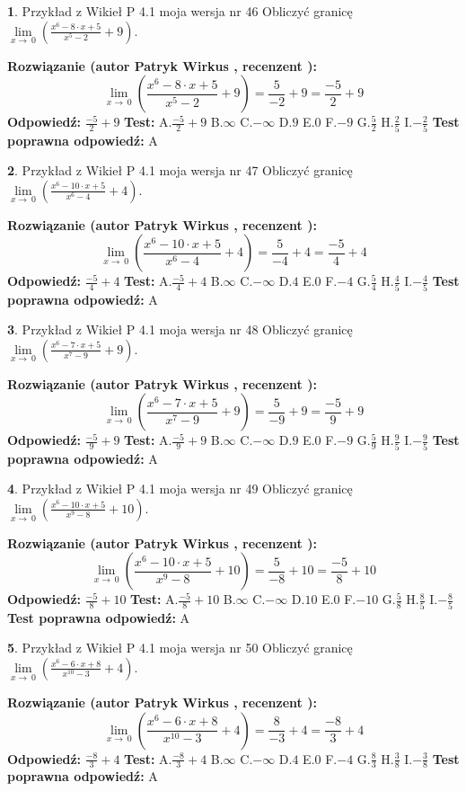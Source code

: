 \documentclass[12pt, a4paper]{article}
\theoremstyle{definition} %
\newtheorem{zad}{}
\newcommand{\zadStart}[1]{\begin{zad}#1\newline}
\newcommand{\zadStop}{\end{zad}}
\newcommand{\rozwStart}[2]{\noindent \textbf{Rozwiązanie (autor #1 , recenzent #2): }\newline}
\newcommand{\rozwStop}{\newline}
\newcommand{\odpStart}{\noindent \textbf{Odpowiedź:}\newline}
\newcommand{\odpStop}{\newline}
\newcommand{\testStart}{\noindent \textbf{Test:}\newline}
\newcommand{\testStop}{\newline}
\newcommand{\kluczStart}{\noindent \textbf{Test poprawna odpowiedź:}\newline}
\newcommand{\kluczStop}{\newline}
\begin{document}
\zadStart{Przykład z Wikieł P 4.1 moja wersja nr 46}
Obliczyć granicę $\lim\limits_{x\to\ 0}(\frac{x^{6}-8 \cdot x +5}{x^{5}-2}+9)$.
\zadStop
\rozwStart{Patryk Wirkus}{}
$$\lim\limits_{x\to\ 0}(\frac{x^{6}-8 \cdot x +5}{x^{5}-2}+9)=\frac{5}{-2}+9=\frac{-5}{2}+9$$
\rozwStop
\odpStart
$\frac{-5}{2}+9$
\odpStop
\testStart
A.$\frac{-5}{2}+9$
B.$\infty$
C.$-\infty$
D.$9$
E.$0$
F.$-9$
G.$\frac{5}{2}$
H.$\frac{2}{5}$
I.$-\frac{2}{5}$
\testStop
\kluczStart
A
\kluczStop



\zadStart{Przykład z Wikieł P 4.1 moja wersja nr 47}
Obliczyć granicę $\lim\limits_{x\to\ 0}(\frac{x^{6}-10 \cdot x +5}{x^{6}-4}+4)$.
\zadStop
\rozwStart{Patryk Wirkus}{}
$$\lim\limits_{x\to\ 0}(\frac{x^{6}-10 \cdot x +5}{x^{6}-4}+4)=\frac{5}{-4}+4=\frac{-5}{4}+4$$
\rozwStop
\odpStart
$\frac{-5}{4}+4$
\odpStop
\testStart
A.$\frac{-5}{4}+4$
B.$\infty$
C.$-\infty$
D.$4$
E.$0$
F.$-4$
G.$\frac{5}{4}$
H.$\frac{4}{5}$
I.$-\frac{4}{5}$
\testStop
\kluczStart
A
\kluczStop



\zadStart{Przykład z Wikieł P 4.1 moja wersja nr 48}
Obliczyć granicę $\lim\limits_{x\to\ 0}(\frac{x^{6}-7 \cdot x +5}{x^{7}-9}+9)$.
\zadStop
\rozwStart{Patryk Wirkus}{}
$$\lim\limits_{x\to\ 0}(\frac{x^{6}-7 \cdot x +5}{x^{7}-9}+9)=\frac{5}{-9}+9=\frac{-5}{9}+9$$
\rozwStop
\odpStart
$\frac{-5}{9}+9$
\odpStop
\testStart
A.$\frac{-5}{9}+9$
B.$\infty$
C.$-\infty$
D.$9$
E.$0$
F.$-9$
G.$\frac{5}{9}$
H.$\frac{9}{5}$
I.$-\frac{9}{5}$
\testStop
\kluczStart
A
\kluczStop



\zadStart{Przykład z Wikieł P 4.1 moja wersja nr 49}
Obliczyć granicę $\lim\limits_{x\to\ 0}(\frac{x^{6}-10 \cdot x +5}{x^{9}-8}+10)$.
\zadStop
\rozwStart{Patryk Wirkus}{}
$$\lim\limits_{x\to\ 0}(\frac{x^{6}-10 \cdot x +5}{x^{9}-8}+10)=\frac{5}{-8}+10=\frac{-5}{8}+10$$
\rozwStop
\odpStart
$\frac{-5}{8}+10$
\odpStop
\testStart
A.$\frac{-5}{8}+10$
B.$\infty$
C.$-\infty$
D.$10$
E.$0$
F.$-10$
G.$\frac{5}{8}$
H.$\frac{8}{5}$
I.$-\frac{8}{5}$
\testStop
\kluczStart
A
\kluczStop



\zadStart{Przykład z Wikieł P 4.1 moja wersja nr 50}
Obliczyć granicę $\lim\limits_{x\to\ 0}(\frac{x^{6}-6 \cdot x +8}{x^{10}-3}+4)$.
\zadStop
\rozwStart{Patryk Wirkus}{}
$$\lim\limits_{x\to\ 0}(\frac{x^{6}-6 \cdot x +8}{x^{10}-3}+4)=\frac{8}{-3}+4=\frac{-8}{3}+4$$
\rozwStop
\odpStart
$\frac{-8}{3}+4$
\odpStop
\testStart
A.$\frac{-8}{3}+4$
B.$\infty$
C.$-\infty$
D.$4$
E.$0$
F.$-4$
G.$\frac{8}{3}$
H.$\frac{3}{8}$
I.$-\frac{3}{8}$
\testStop
\kluczStart
A
\kluczStop
\end{document}
